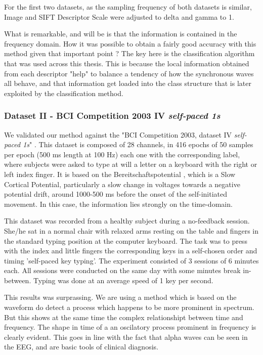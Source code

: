 For the first two datasets, as the sampling frequency of both datasets is similar, Image and SIFT Descriptor Scale were adjusted to delta and gamma to 1.

What is remarkable, and will be is that the information is contained in the frequency domain.  How it was possible to obtain a fairly good accuracy with this method given that important point ?  The key here is the classification algorithm that was used across this thesis.  This is because the local information obtained from each descriptor "help" to balance a tendency of how the synchronous waves all behave, and that information get loaded into the class structure that is later exploited by the classification method.

\subsubsection{Dataset II - BCI Competition 2003 IV \textit{self-paced 1s}}
We validated our method against the "BCI Competition 2003, dataset IV \textit{self-paced 1s}" \cite{c51}. This dataset is composed of 28 channels, in 416 epochs of 50 samples per epoch (500 ms length at 100 Hz) each one with the corresponding label, where subjects were asked to type at will a letter on a keyboard with the right or left index finger.  It is based on the Bereitschaftspotential \cite{c52}, which is a Slow Cortical Potential, particularly a slow change in voltages towards a negative potential drift, around 1000-500 ms before the onset of the self-initiated movement.  In this case, the information lies strongly on the time-domain.

This dataset was recorded from a healthy subject during a no-feedback session. She/he sat in a normal chair with relaxed arms resting on the table and fingers in the standard typing position at the computer keyboard. The task was to press with the index and little fingers the corresponding keys in a self-chosen order and timing 'self-paced key typing'. The experiment consisted of 3 sessions of 6 minutes each. All sessions were conducted on the same day with some minutes break in-between. Typing was done at an average speed of 1 key per second.  



This results was surprassing.  We are using a method which is based on the waveform do detect a process which happens to be more prominent in spectrum.  But this shows at the same time the complex relationshipt between time and frequency.  The shape in time of a an oscilatory process prominent in frequency is clearly evident.  This goes in line with the fact that alpha waves can be seen in the EEG, and are basic tools of clinical diagnosis.